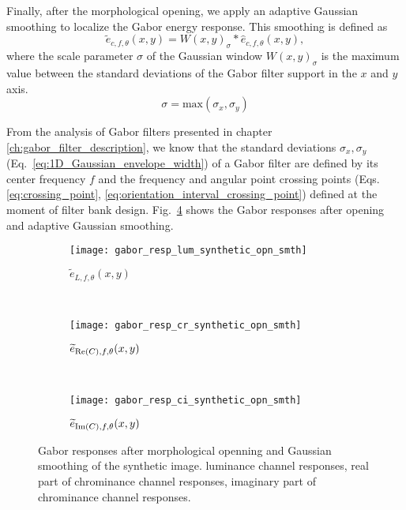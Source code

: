 Finally, after the morphological opening, we apply an adaptive Gaussian smoothing to localize the Gabor energy response. This smoothing is defined as 
\begin{equation}\label{eq:gabor_energy_smth}
	\widetilde{e}_{c, f, \theta}(x,y) = W(x, y)_\sigma\ast \widehat{e}_{c, f, \theta}(x,y),
\end{equation}
where the scale parameter $\sigma$ of the Gaussian window $W(x,y)_\sigma$ is the maximum value between the standard deviations of the Gabor filter support in the $x$ and $y$ axis.
\begin{equation}\label{eq:gauss_sigma_smth}
	\sigma = \mathrm{max}(\sigma_x, \sigma_y)
\end{equation}

From the analysis of Gabor filters presented in chapter \ref{ch:gabor_filter_description}, we know that the standard deviations $\sigma_x, \sigma_y$ (Eq.\ \eqref{eq:1D_Gaussian_envelope_width}) of a Gabor filter are defined by its center frequency $f$ and the frequency and angular point crossing points (Eqs. \eqref{eq:crossing_point}, \eqref{eq:orientation_interval_crossing_point}) defined at the moment of filter bank design. Fig.\ \ref{fig:synthetic_img_gresponses_opn_smth} shows the Gabor responses after opening and adaptive Gaussian smoothing. 

\begin{figure}[!ht]
    \centering
    \begin{subfigure}[b]{\textwidth}   
        \texttt{[image: gabor\_resp\_lum\_synthetic\_opn\_smth]}
        \caption{$\widetilde{e}_{L, f, \theta}(x,y)$} 
        \label{fig:lum_gabor_energies_opn_smth}
    \end{subfigure} \\ [2ex]   
    \begin{subfigure}[b]{\textwidth}   
    	\texttt{[image: gabor\_resp\_cr\_synthetic\_opn\_smth]}
    	\caption{$\widetilde{e}_{\mathrm{Re}(C), f, \theta}(x,y)$}
        \label{fig:cr_gabor_energie_opn_smth}
    \end{subfigure} \\ [2ex]    	
    \begin{subfigure}[b]{\textwidth}  
        \texttt{[image: gabor\_resp\_ci\_synthetic\_opn\_smth]}
        \caption{$\widetilde{e}_{\mathrm{Im}(C), f, \theta}(x,y)$}
        \label{fig:ci_gabor_energies_opn_smth} 
    \end{subfigure} 
    	    
    \caption{Gabor responses after morphological openning and Gaussian smoothing of the synthetic image.  luminance channel responses,  real part of chrominance channel responses,  imaginary part of chrominance channel responses.}\label{fig:synthetic_img_gresponses_opn_smth}    
\end{figure}


